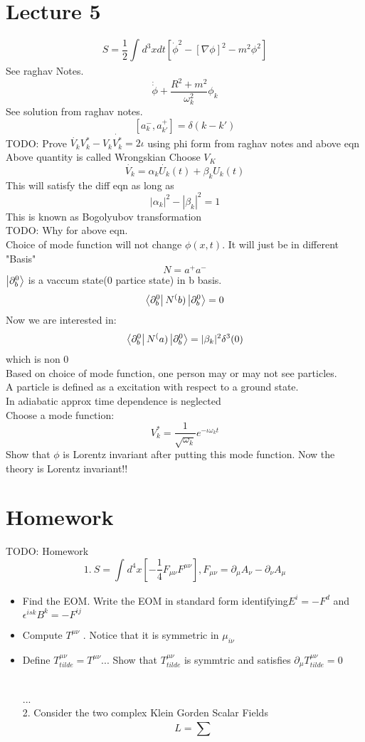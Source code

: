 \documentclass{scrartcl}
\begin{document}
\section{Lecture 5}
\[ S = \displaystyle\frac{1}{2} \displaystyle\int_{}^{} d^3 x dt [\dot{\phi}^2 - [\nabla \phi]^2 - m^2\phi^2] \]
See raghav Notes.
\[ \dot{\dot{\phi}} + \displaystyle\frac{R^2 + m^2}{\omega_k^2} \phi_k \]
See solution from raghav notes.
\[ [a_k^- , a_{k'}^+] = \delta(k - k') \]
TODO: Prove \( \dot{V_k} V_k^* - V_k \dot{V_k^*} = 2 \iota \) using phi form from raghav notes and above eqn\\
Above quantity is called Wrongskian
Choose \( V_K \)
\[ \dot{V_k} = \alpha_k \dot{U_k}(t) + \beta_k  U_k(t) \]
This will satisfy the diff eqn as long as 
\[ |\alpha_k|^2 - | \beta_k |^2 = 1 \]
This is known as Bogolyubov transformation\\
TODO: Why for above eqn.\\
Choice of mode function will not change \( \phi(x,t) \). It will just be in different "Basis"
\[ N = a^+ a^- \]
\( \ket{\partial^0_b} \) is a vaccum state(0 partice state) in b basis.
\[ \bra{\partial^0_b} N^(b) \ket{\partial^0_b} = 0  \]
Now we are interested in:
\[ \bra{\partial^0_b} N^(a) \ket{\partial^0_b} = |\beta_k|^2 \delta^3(0)  \]
which is non 0\\
Based on choice of mode function, one person may or may not see particles.\\
A particle is defined as a excitation with respect to a ground state.\\
In adiabatic approx time dependence is neglected\\
Choose a mode function:
\[ V_k^* = \displaystyle\frac{1}{\sqrt{\omega_k}} e^{- \iota \omega_k t}  \]
Show that \( \phi \) is Lorentz invariant after putting this mode function. Now the theory is Lorentz invariant!!
\section{Homework}
TODO: Homework
\[1.\   S = \displaystyle\int_{}^{} d^4 x [ - \displaystyle\frac{1}{4} F_{\mu\nu}F^{\mu\nu}] , F_{\mu\nu} = \partial_\mu A_\nu - \partial_\nu A_\mu \]
\begin{itemize}
	\item Find the EOM. Write the EOM in standard form identifying\( E^i = - F^d\) and \( \epsilon^{isk} B^k = -F^{ij} \)
	\item Compute \( T^{\mu\nu} \) . Notice that it is symmetric in \( \mu_{i\nu} \)
	\item Define \( T_{tilde}^{\mu\nu} =  T^{\mu\nu} ... \)
		Show that \(  T_{tilde}^{\mu\nu}\) is symmtric and satisfies \( \partial_\mu T_{tilde}^{\mu\nu} = 0 \)

\\
... \\
2. Consider the two complex Klein Gorden Scalar Fields
\[ L = \displaystyle\sum_{}^{} \]
\end{itemize}
\end{document}
